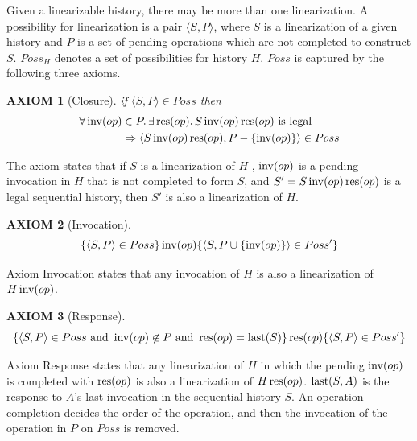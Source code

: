 \documentclass[12pt,a4paper,titlepage]{article}
\theoremstyle{break}
\newtheorem{axiom}{AXIOM}[section]
\begin{document}
Given a linearizable history, there may be more than one linearization.
A possibility for linearization is a pair \(\langle S,P\rangle\), where $S$ is a linearization of a given history and $P$ is a set of pending operations which are not completed to construct $S$.
\(Poss_H\) denotes a set of possibilities for history $H$.
$Poss$ is captured by the following three axioms.
  \begin{axiom}[Closure]\label{ax:closure}
if \(\langle S,P\rangle\in Poss\) then
    \begin{displaymath}
      \begin{aligned}
\forall\mathop{\mathrm{inv}}\nolimits(op)&\in P.\,\exists\mathop{\mathrm{res}}\nolimits(op).\,S\mathop{\mathrm{inv}}\nolimits(op)\mathop{\mathrm{res}}\nolimits(op)\mbox{ is legal}\\
&\Rightarrow\langle S\mathop{\mathrm{inv}}\nolimits(op)\mathop{\mathrm{res}}\nolimits(op),P-\{\mathop{\mathrm{inv}}\nolimits(op)\}\rangle\in Poss
      \end{aligned}
    \end{displaymath}
  \end{axiom}
The axiom states that if $S$ is a linearization of $H$ , \(\mathop{\mathrm{inv}}\nolimits(op)\) is a pending invocation in $H$ that is not completed to form $S$, and \(S'=S\mathop{\mathrm{inv}}\nolimits(op)\mathop{\mathrm{res}}\nolimits(op)\) is a legal sequential history, then $S'$ is also a linearization of $H$.
  \begin{axiom}[Invocation]
    \begin{displaymath}
\{\langle S,P\rangle\in Poss\}\mathop{\mathrm{inv}}\nolimits(op)\{\langle S,P\cup\{\mathop{\mathrm{inv}}\nolimits(op)\}\rangle\in Poss'\}
    \end{displaymath}
  \end{axiom}
Axiom Invocation states that any invocation of $H$ is also a linearization of \(H\mathop{\mathrm{inv}}\nolimits(op)\).
  \begin{axiom}[Response]\label{ax:response}
    \begin{displaymath}
\{\langle S,P\rangle\in Poss\mbox{ and }\mathop{\mathrm{inv}}\nolimits(op)\not\in P\mbox{ and }\mathop{\mathrm{res}}\nolimits(op)=\mathop{\mathrm{last}}\nolimits(S)\}\mathop{\mathrm{res}}\nolimits(op)\{\langle S,P\rangle\in Poss'\}
    \end{displaymath}
  \end{axiom}
Axiom Response states that any linearization of $H$ in which the pending \(\mathop{\mathrm{inv}}\nolimits(op)\) is completed with \(\mathop{\mathrm{res}}\nolimits(op)\) is also a linearization of \(H\mathop{\mathrm{res}}\nolimits(op)\).
\(\mathop{\mathrm{last}}\nolimits(S,A)\) is the response to $A$'s last invocation in the sequential history $S$.
An operation completion decides the order of the operation, and then the invocation of the operation in $P$ on $Poss$ is removed.
%
%
\end{document}
